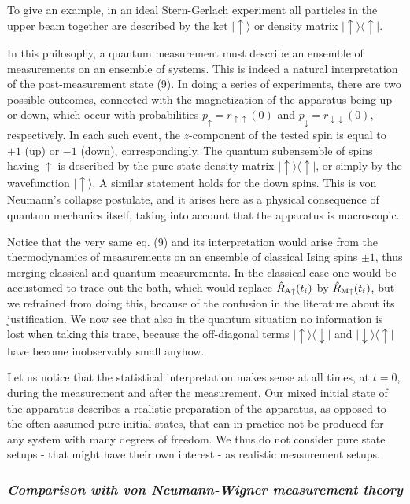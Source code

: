 \documentclass[aps,prb,floatfix,twocolumn]{revtex4}
\newcommand{\RA}{{\rm A}}
\newcommand{\RM}{{\rm M}}
\newcommand{\down}{{\downarrow}}
\newcommand{\up}{{\uparrow}}
\newcommand{\uu}{{\uparrow\uparrow}}
\newcommand{\dd}{{\downarrow\downarrow}}
\newcommand{\tf}{t_{\rm f}}
\begin{document}
To give an example, in an ideal Stern-Gerlach experiment all particles in the upper
beam together are described by the ket $|\up\rangle$ or density matrix
$|\up\rangle\langle\up|$.

In this philosophy, a quantum measurement must describe  an ensemble of 
measurements on an ensemble of systems. 
This is indeed a natural interpretation of the post-measurement state (9).
 In doing a series of experiments, there are two possible
outcomes, connected with the magnetization of the apparatus being up or down,
which occur with probabilities $p_\up=r_\uu(0)$ and $p_\down=r_\dd(0)$, respectively.
In each such event, the $z$-component of the tested spin is 
equal to $+1$ (up) or $-1$ (down), correspondingly. 
The quantum subensemble of spins having $\up$ is described by
the pure state density matrix $|\up\rangle\langle \up|$, or simply
by the wavefunction $|\up\rangle$. A similar statement holds for the
down spins. This is von Neumann's  collapse postulate, and it arises 
here as a physical consequence of  quantum mechanics itself, 
taking into account that the apparatus is macroscopic.

Notice that the very same eq. (9) and its interpretation would arise from
the thermodynamics of measurements on an ensemble of classical Ising spins $\pm 1$,
thus merging classical and quantum measurements.
In the classical case one would be accustomed to trace out the bath, 
which would replace $\hat R_{\RA\up}(\tf)$ by $\hat R_{\RM\up}(\tf)$,
but we refrained from doing this, because of the confusion 
in the literature about its justification. 
We now see that also in the quantum situation
no information is lost when taking this trace,
because the off-diagonal terms $|\up\rangle\langle\down|$ and
$|\down\rangle\langle\up|$ have become inobservably small  anyhow. 

Let us notice that the statistical interpretation makes sense at all times,
at $t=0$, during the measurement and after the measurement.
Our mixed initial state of the apparatus describes a realistic preparation
of the apparatus, as opposed to the often assumed pure initial states, that
can in practice not be produced for any system with many degrees of freedom.
We thus do not consider pure state setups - that might have their own interest - 
as realistic measurement setups.

\subsubsection*{\it Comparison with von Neumann-Wigner measurement theory}
\end{document}
